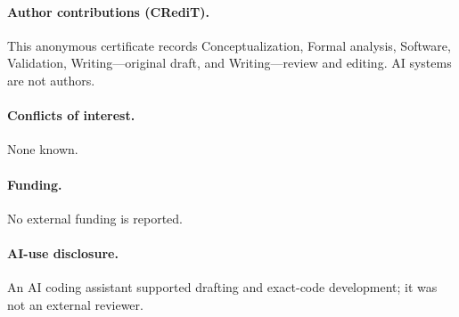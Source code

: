 \documentclass[10pt]{article}
\begin{document}
\paragraph{Author contributions (CRediT).} This anonymous certificate records
Conceptualization, Formal analysis, Software, Validation, Writing---original
draft, and Writing---review and editing.  AI systems are not authors.
\paragraph{Conflicts of interest.} None known.
\paragraph{Funding.} No external funding is reported.
\paragraph{AI-use disclosure.} An AI coding assistant supported drafting and
exact-code development; it was not an external reviewer.
\end{document}
